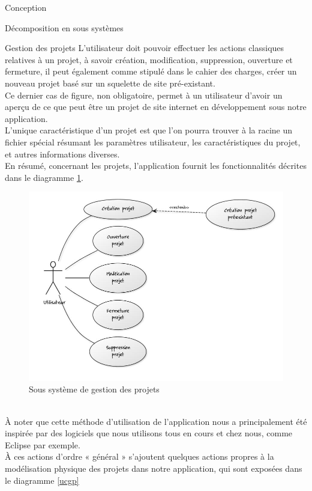 \documentclass[a4paper, 12pt]{report}
\begin{document}
\begin{part}{Conception}
\begin{chapter}{Décomposition en sous systèmes}
\begin{section}{Gestion des projets}
				L'utilisateur doit pouvoir effectuer les actions classiques relatives à un projet, à savoir création, 
				modification, suppression, ouverture et fermeture, il peut également comme stipulé dans le cahier des charges, 
				créer un nouveau projet basé sur un squelette de site pré-existant.\\
				Ce dernier cas de figure, non obligatoire, permet à un utilisateur d'avoir un aperçu de ce que peut être un projet de 
				site internet en développement sous notre application.\\
				L'unique caractéristique d'un projet est que l'on pourra trouver à la racine un fichier spécial résumant les paramètres utilisateur,
				les caractéristiques du projet, et autres informations diverses.\\
				En résumé, concernant les projets, l'application fournit les fonctionnalités décrites dans le diagramme \ref{marchandise}.
				\begin{figure}[ht]
					\begin{center}
						\includegraphics[width=12cm]{images/gestionProjets.jpg}
						\caption{Sous système de gestion des projets}
						\label{marchandise}
					\end{center}
				\end{figure}~\\
				À noter que cette méthode d'utilisation de l'application nous a principalement été inspirée
				par des logiciels que nous utilisons tous en cours et chez nous, comme Eclipse par exemple.\\
				À ces actions d'ordre « général » s'ajoutent quelques actions propres à la modélisation physique des projets dans notre application,
				qui sont exposées dans le diagramme \ref{ucgp}

\end{section}
\end{chapter}
\end{part}
\end{document}
